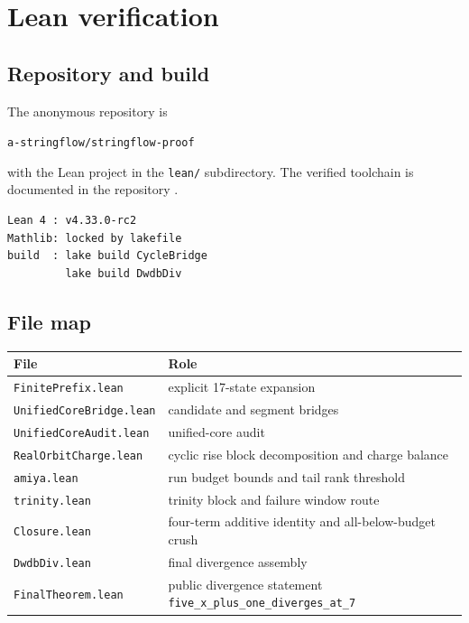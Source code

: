 \section{Lean verification}\label{sec:lean}

\subsection{Repository and build}

The anonymous repository is
\begin{center}
  \texttt{a-stringflow/stringflow-proof}
\end{center}
with the Lean project in the \texttt{lean/} subdirectory.  The verified
toolchain is documented in the repository
\cite{stringflowproof}.
\begin{verbatim}
Lean 4 : v4.33.0-rc2
Mathlib: locked by lakefile
build  : lake build CycleBridge
         lake build DwdbDiv
\end{verbatim}

\subsection{File map}

\begin{center}
\begin{tabular}{ll}
\toprule
File & Role \\
\midrule
\texttt{FinitePrefix.lean} & explicit 17-state expansion \\
\texttt{UnifiedCoreBridge.lean} & candidate and segment bridges \\
\texttt{UnifiedCoreAudit.lean} & unified-core audit \\
\texttt{RealOrbitCharge.lean} & cyclic rise block decomposition and charge balance \\
\texttt{amiya.lean} & run budget bounds and tail rank threshold \\
\texttt{trinity.lean} & trinity block and failure window route \\
\texttt{Closure.lean} & four-term additive identity and all-below-budget crush \\
\texttt{DwdbDiv.lean} & final divergence assembly \\
\texttt{FinalTheorem.lean} & public divergence statement \texttt{five\_x\_plus\_one\_diverges\_at\_7} \\
\bottomrule
\end{tabular}
\end{center}

